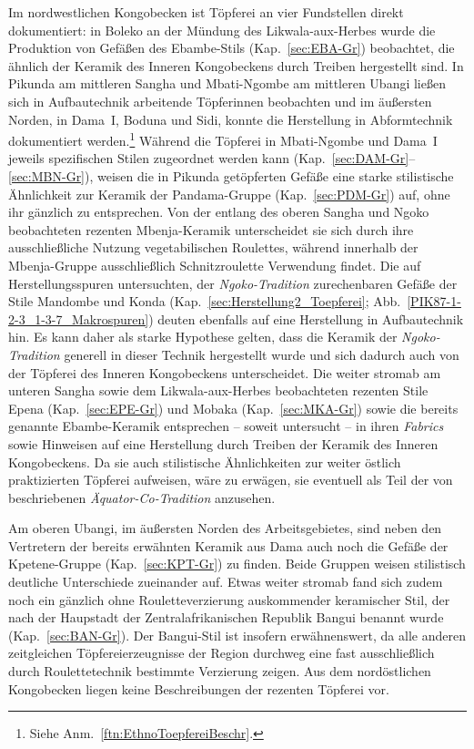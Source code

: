 Im nordwestlichen Kongobecken ist Töpferei an vier Fundstellen direkt dokumentiert: in Boleko an der Mündung des \mbox{Likwala}-\mbox{aux}-\mbox{Herbes} wurde die Produktion von Gefäßen des Ebambe-Stils (Kap.~\ref{sec:EBA-Gr}) beobachtet, die ähnlich der Keramik des Inneren Kongobeckens durch Treiben hergestellt sind. In Pikunda am mittleren \mbox{Sangha} und Mbati-Ngombe am mittleren \mbox{Ubangi} ließen sich in Aufbautechnik arbeitende Töpferinnen beobachten und im äußersten Norden, in Dama~I, Boduna und Sidi, konnte die Herstellung in Abformtechnik dokumentiert werden.\footnote{Siehe Anm.~\ref{ftn:EthnoToepfereiBeschr}.} Während die Töpferei in Mbati-Ngombe und Dama~I jeweils spezifischen Stilen zugeordnet werden kann (Kap.~\ref{sec:DAM-Gr}--\ref{sec:MBN-Gr}), weisen die in Pikunda getöpferten Gefäße eine starke stilistische Ähnlichkeit zur Keramik der Pandama-Gruppe (Kap.~\ref{sec:PDM-Gr}) auf, ohne ihr gänzlich zu entsprechen. Von der entlang des oberen \mbox{Sangha} und \mbox{Ngoko} beobachteten rezenten Mbenja-Keramik unterscheidet sie sich durch ihre ausschließliche Nutzung vegetabilischen Roulettes, während innerhalb der Mbenja-Gruppe ausschließlich Schnitzroulette Verwendung findet. Die auf Herstellungsspuren untersuchten, der \textit{\mbox{Ngoko}-Tradition} zurechenbaren Gefäße der Stile Mandombe und Konda (Kap.~\ref{sec:Herstellung2_Toepferei}; Abb.~\ref{PIK87-1-2-3_1-3-7_Makrospuren}) deuten ebenfalls auf eine Herstellung in Aufbautechnik hin. Es kann daher als starke Hypothese gelten, dass die Keramik der \textit{\mbox{Ngoko}-Tradition} generell in dieser Technik hergestellt wurde und sich dadurch auch von der Töpferei des Inneren Kongobeckens unterscheidet. Die weiter stromab am unteren \mbox{Sangha} sowie dem \mbox{Likwala}-\mbox{aux}-\mbox{Herbes} beobachteten rezenten Stile Epena (Kap.~\ref{sec:EPE-Gr}) und Mobaka (Kap.~\ref{sec:MKA-Gr}) sowie die bereits genannte Ebambe-Keramik entsprechen -- soweit untersucht -- in ihren \textit{Fabrics} sowie Hinweisen auf eine Herstellung durch Treiben der Keramik des Inneren Kongobeckens. Da sie auch stilistische Ähnlichkeiten zur weiter östlich praktizierten Töpferei aufweisen, wäre zu erwägen, sie eventuell als Teil der von \textcite[222 Abb.~4, 224, 273]{Wotzka.1995} beschriebenen \textit{Äquator-Co-Tradition} anzusehen.

Am oberen \mbox{Ubangi}, im äußersten Norden des Arbeitsgebietes, sind neben den Vertretern der bereits erwähnten Keramik aus Dama auch noch die Gefäße der Kpetene-Gruppe (Kap.~\ref{sec:KPT-Gr}) zu finden. Beide Gruppen weisen stilistisch deutliche Unterschiede zueinander auf. Etwas weiter stromab fand sich zudem noch ein gänzlich ohne Rouletteverzierung auskommender keramischer Stil, der nach der Haupstadt der Zentralafrikanischen Republik Bangui benannt wurde (Kap.~\ref{sec:BAN-Gr}). Der Bangui-Stil ist insofern erwähnenswert, da alle anderen zeitgleichen Töpfereierzeugnisse der Region durchweg eine fast ausschließlich durch Roulettetechnik bestimmte Verzierung zeigen. Aus dem nordöstlichen Kongobecken liegen keine Beschreibungen der rezenten Töpferei vor.

